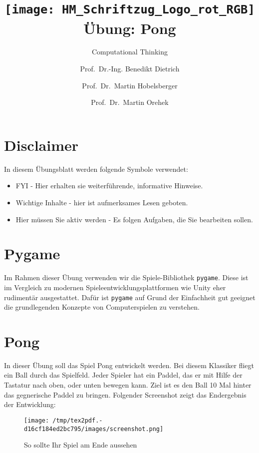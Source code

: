 \documentclass[
]{scrartcl}
\title{\texttt{[image: HM\_Schriftzug\_Logo\_rot\_RGB]} \\[\bigskipamount]Übung:
Pong}
\subtitle{Computational Thinking}
\author{Prof.~Dr.-Ing. Benedikt Dietrich \and Prof.~Dr.~Martin
Hobelsberger \and Prof.~Dr.~Martin Orehek}
\date{}
\providecommand{\tightlist}{%
  \setlength{\itemsep}{0pt}\setlength{\parskip}{0pt}}
\begin{document}
\maketitle

\hypertarget{disclaimer}{%
\section{Disclaimer}\label{disclaimer}}

In diesem Übungsblatt werden folgende Symbole verwendet:

\begin{itemize}
\tightlist
\item
   FYI - Hier erhalten sie weiterführende, informative
  Hinweise.
\item
   Wichtige Inhalte - hier ist aufmerksames
  Lesen geboten.
\item
   Hier müssen Sie aktiv werden - Es folgen Aufgaben, die
  Sie bearbeiten sollen.
\end{itemize}

\hypertarget{pygame}{%
\section{Pygame}\label{pygame}}

Im Rahmen dieser Übung verwenden wir die Spiele-Bibliothek
\texttt{pygame}. Diese ist im Vergleich zu modernen
Spieleentwicklungsplattformen wie Unity eher rudimentär ausgestattet.
Dafür ist \texttt{pygame} auf Grund der Einfachheit gut geeignet die
grundlegenden Konzepte von Computerspielen zu verstehen.

\hypertarget{pong}{%
\section{Pong}\label{pong}}

In dieser Übung soll das Spiel Pong entwickelt werden. Bei diesem
Klassiker fliegt ein Ball durch das Spielfeld. Jeder Spieler hat ein
Paddel, das er mit Hilfe der Tastatur nach oben, oder unten bewegen
kann. Ziel ist es den Ball 10 Mal hinter das gegnerische Paddel zu
bringen. Folgender Screenshot zeigt das Endergebnis der Entwicklung:

\begin{figure}
\centering
\texttt{[image: /tmp/tex2pdf.-d16cf184ed2bc795/images/screenshot.png]}
\caption{So sollte Ihr Spiel am Ende aussehen}
\end{figure}
\end{document}
